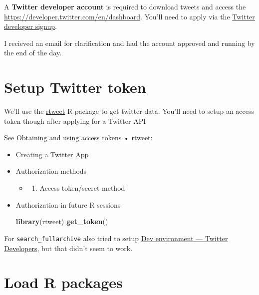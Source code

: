 \documentclass[]{book}
\newenvironment{Shaded}{\begin{snugshade}}{\end{snugshade}}
\newcommand{\KeywordTok}[1]{\textcolor[rgb]{0.13,0.29,0.53}{\textbf{#1}}}
\newcommand{\NormalTok}[1]{#1}
\providecommand{\tightlist}{%
  \setlength{\itemsep}{0pt}\setlength{\parskip}{0pt}}
\begin{document}
A \textbf{Twitter developer account} is required to download tweets and access the \url{https://developer.twitter.com/en/dashboard}. You'll need to apply via the \href{https://developer.twitter.com/en/apply-for-access}{Twitter developer signup}.

I recieved an email for clarification and had the account approved and running by the end of the day.

\hypertarget{setup-twitter-token}{%
\section{Setup Twitter token}\label{setup-twitter-token}}

We'll use the \href{https://rtweet.info}{rtweet} R package to get twitter data. You'll need to setup an access token though after applying for a Twitter API

See \href{https://rtweet.info/articles/auth.html}{Obtaining and using access tokens • rtweet}:

\begin{itemize}
\item
  Creating a Twitter App
\item
  Authorization methods

  \begin{itemize}
  \item
    \begin{enumerate}
    \def\labelenumi{\arabic{enumi}.}
    \setcounter{enumi}{1}
    \tightlist
    \item
      Access token/secret method
    \end{enumerate}
  \end{itemize}
\item
  Authorization in future R sessions

\begin{Shaded}
\begin{Highlighting}[]
\KeywordTok{library}\NormalTok{(rtweet)}
\KeywordTok{get_token}\NormalTok{()}
\end{Highlighting}
\end{Shaded}
\end{itemize}

For \texttt{search\_fullarchive} also tried to setup \href{https://developer.twitter.com/en/account/environments}{Dev environment --- Twitter Developers}, but that didn't seem to work.

\hypertarget{load-r-packages}{%
\section{Load R packages}\label{load-r-packages}}
\end{document}
